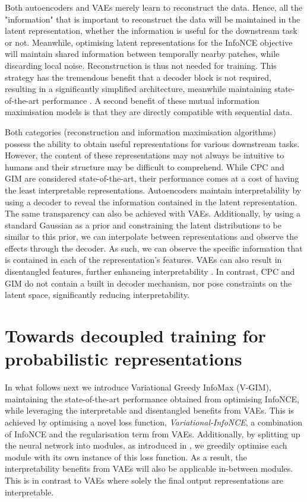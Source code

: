 		Both autoencoders and VAEs merely learn to reconstruct the data. Hence, all the "information" that is important to reconstruct the data will be maintained in the latent representation, whether the information is useful for the downstream task or not. Meanwhile, optimising latent representations for the InfoNCE objective will maintain shared information between temporally nearby patches, while discarding local noise. Reconstruction is thus not needed for training. This strategy has the tremendous benefit that a decoder block is not required, resulting in a significantly simplified architecture, meanwhile maintaining state-of-the-art performance \cite{stackeEvaluationContrastivePredictive2020}. A second benefit of these mutual information maximisation models is that they are directly compatible with sequential data.
		
		Both categories (reconstruction and information maximisation algorithms) possess the ability to obtain useful representations for various downstream tasks. However, the content of these representations may not always be intuitive to humans and their structure may be difficult to comprehend. While CPC and GIM are considered state-of-the-art, their performance comes at a cost of having the least interpretable representations. Autoencoders maintain interpretability by using a decoder to reveal the information contained in the latent representation. The same transparency can also be achieved with VAEs. Additionally, by using a standard Gaussian as a prior and constraining the latent distributions to be similar to this prior, we can interpolate between representations and observe the effects through the decoder. As such, we can observe the specific information that is contained in each of the representation's features. VAEs can also result in disentangled features, further enhancing interpretability \cite{grossuttiDeepLearningInfrared2022}. In contrast, CPC and GIM do not contain a built in decoder mechanism, nor pose constraints on the latent space, significantly reducing interpretability.
		


\section{Towards decoupled training for probabilistic representations} \label{cha:vgim_decoupled_training_for_probabil_repr}
		In what follows next we introduce Variational Greedy InfoMax (V-GIM), maintaining the state-of-the-art performance obtained from optimising InfoNCE, while leveraging the interpretable and disentangled benefits from VAEs. This is achieved by optimising a novel loss function, \textit{Variational-InfoNCE}, a combination of InfoNCE and the regularisation term from VAEs. Additionally, by splitting up the neural network into modules, as introduced in \cite{lowePuttingEndEndtoEnd2020}, we greedily optimise each module with its own instance of this loss function. As a result, the interpretability benefits from VAEs will also be applicable in-between modules. This is in contrast to VAEs where solely the final output representations are interpretable.		
				
